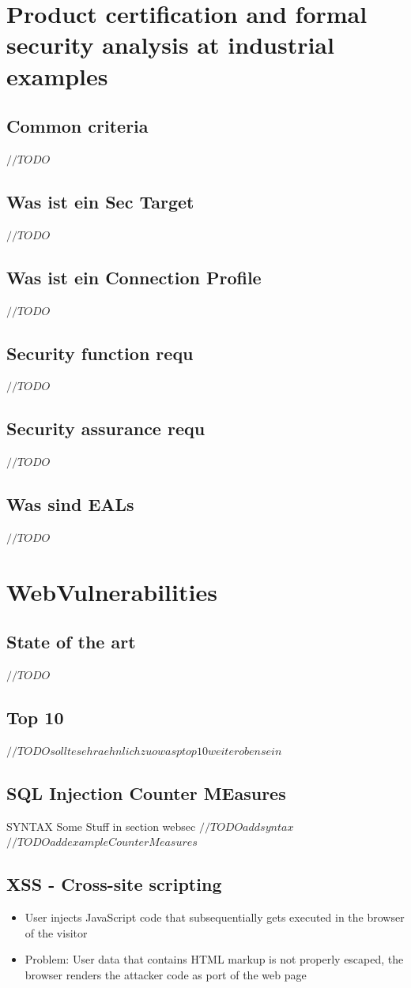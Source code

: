 \documentclass[a4paper, 12pt]{article}
\begin{document}
\section{Product certification and
formal security analysis
at industrial examples}
\subsection{Common criteria}
$ //TODO $
\subsection{Was ist ein Sec Target}
$ //TODO $
\subsection{Was ist ein Connection Profile}
$ //TODO $
\subsection{Security function requ}
$ //TODO $
\subsection{Security assurance requ}
$ //TODO $
\subsection{Was sind EALs}
$ //TODO $

\section{WebVulnerabilities}
\subsection{State of the art}
$ //TODO $
\subsection{Top 10}
$ //TODO sollte sehr aehnlich zu owasp top 10 weiter oben sein$
\subsection{SQL Injection Counter MEasures}
SYNTAX
Some Stuff in section websec 
$ //TODO add syntax $
$ //TODO add example Counter Measures $
\subsection{XSS - Cross-site scripting}
\begin{itemize}
\item User injects JavaScript code that subsequentially gets executed in the browser of the visitor
\item Problem: User data that contains HTML markup is not properly escaped, the browser renders the attacker code as port of the web page
\end{itemize}
\end{document}
